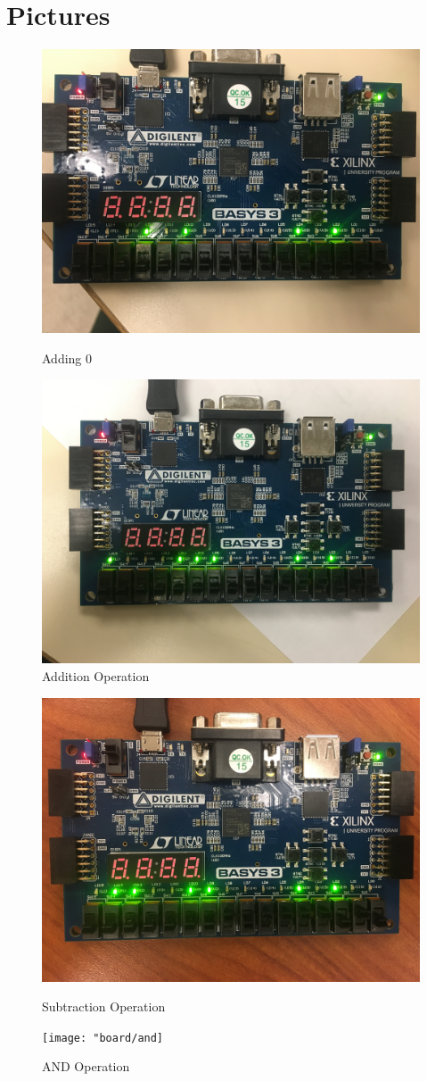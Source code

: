 \documentclass[11pt]{article}
\begin{document}
\section*{Pictures}
\begin{figure}[ht]
	\centering
	\includegraphics[width=12cm]{"board/step1"}
	\caption{Adding 0}
	\includegraphics[width=12cm]{"board/add"}
	\caption{Addition Operation}
\end{figure}
\begin{figure}[ht]
	\centering
	\includegraphics[width=12cm]{"board/sub"}
	\caption{Subtraction Operation}
	\texttt{[image: "board/and]}
	\caption{AND Operation}
\end{figure}
\end{document}
